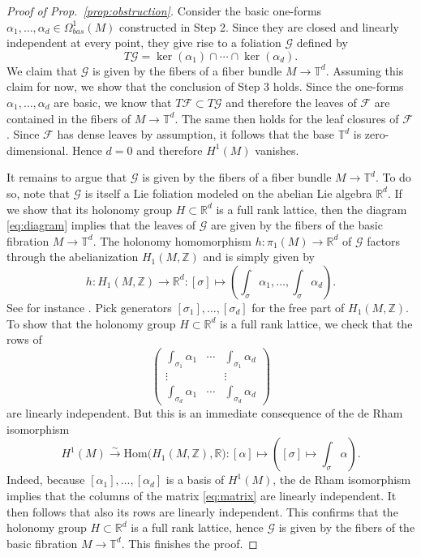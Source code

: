 \documentclass[11pt, letterpaper, oneside,reqno]{amsart}
\theoremstyle{plain}
\theoremstyle{underline}
\theoremstyle{definition}
\theoremstyle{remark}
\begin{document}
\begin{proof}[Proof of Prop.~\ref{prop:obstruction}]
\vspace{0.1cm}
Consider the basic one-forms $\alpha_1,\ldots,\alpha_d\in\Omega^{1}_{bas}(M)$ constructed in Step 2. Since they are closed and linearly independent at every point, they give rise to a foliation $\mathcal{G}$ defined by
\[
T\mathcal{G}=\ker(\alpha_1)\cap\cdots\cap\ker(\alpha_d).
\]
We claim that $\mathcal{G}$ is given by the fibers of a fiber bundle $M\rightarrow\mathbb{T}^{d}$. Assuming this claim for now, we show that the conclusion of Step 3 holds. Since the one-forms $\alpha_1,\ldots,\alpha_d$ are basic, we know that $T\mathcal{F}\subset T\mathcal{G}$ and therefore the leaves of $\mathcal{F}$ are contained in the fibers of $M\rightarrow\mathbb{T}^{d}$. The same then holds for the leaf closures of $\mathcal{F}$. Since $\mathcal{F}$ has dense leaves by assumption, it follows that the base $\mathbb{T}^{d}$ is zero-dimensional. Hence $d=0$ and therefore $H^{1}(M)$ vanishes.

It remains to argue that $\mathcal{G}$ is given by the fibers of a fiber bundle $M\rightarrow\mathbb{T}^{d}$. To do so, note that $\mathcal{G}$ is itself a Lie foliation modeled on the abelian Lie algebra $\mathbb{R}^{d}$. If we show that its holonomy group $H\subset\mathbb{R}^{d}$ is a full rank lattice, then the diagram \eqref{eq:diagram} implies that the leaves of $\mathcal{G}$ are given by the fibers of the basic fibration $M\rightarrow\mathbb{T}^{d}$. The holonomy homomorphism $h:\pi_{1}(M)\rightarrow\mathbb{R}^{d}$ of $\mathcal{G}$ factors through the abelianization $H_{1}(M,\mathbb{Z})$ and is simply given by
\[
h:H_{1}(M,\mathbb{Z})\rightarrow\mathbb{R}^{d}:[\sigma]\mapsto\left( \int_{\sigma}\alpha_1,\ldots,\int_{\sigma}\alpha_d\right).
\]
See for instance \cite[Ex.~4.22]{Moerdijk}. Pick generators $[\sigma_1],\ldots,[\sigma_d]$ for the free part of $H_{1}(M,\mathbb{Z})$. To show that the holonomy group $H\subset\mathbb{R}^{d}$ is a full rank lattice, we check that the rows of
\begin{equation}\label{eq:matrix}
\begin{pmatrix}
\int_{\sigma_1}\alpha_1 & \cdots & \int_{\sigma_1}\alpha_d \\
\vdots & & \vdots \\
\int_{\sigma_d}\alpha_1 & \cdots & \int_{\sigma_d}\alpha_d
\end{pmatrix}
\end{equation}
are linearly independent. But this is an immediate consequence of the de Rham isomorphism
\[
H^{1}(M)\overset{\sim}{\longrightarrow}\text{Hom}\big(H_{1}(M,\mathbb{Z}),\mathbb{R}\big):[\alpha]\mapsto\left([\sigma]\mapsto\int_{\sigma}\alpha\right).
\]
Indeed, because $[\alpha_1],\ldots,[\alpha_d]$ is a basis of $H^{1}(M)$, the de Rham isomorphism implies that the columns of the matrix \eqref{eq:matrix} are linearly independent. It then follows that also its rows are linearly independent. This confirms that the holonomy group $H\subset\mathbb{R}^{d}$ is a full rank lattice, hence $\mathcal{G}$ is given by the fibers of the basic fibration $M\rightarrow\mathbb{T}^{d}$. This finishes the proof.
\end{proof}		
\end{document}
